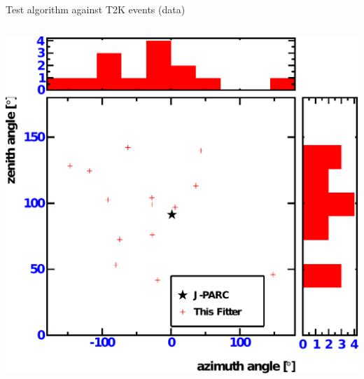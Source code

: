 \documentclass[14pt]{beamer}
\begin{document}
\begin{frame}{Test algorithm against T2K events (data)}
\begin{columns}[t]
\begin{block}{}
			\includegraphics[width=\linewidth]{analyzed_rtq_t2k_nu_noNegativeCharge_prepulseCut_t2kReconDir.pdf}
		\end{block}
	\end{columns}
\end{frame}
\end{document}

